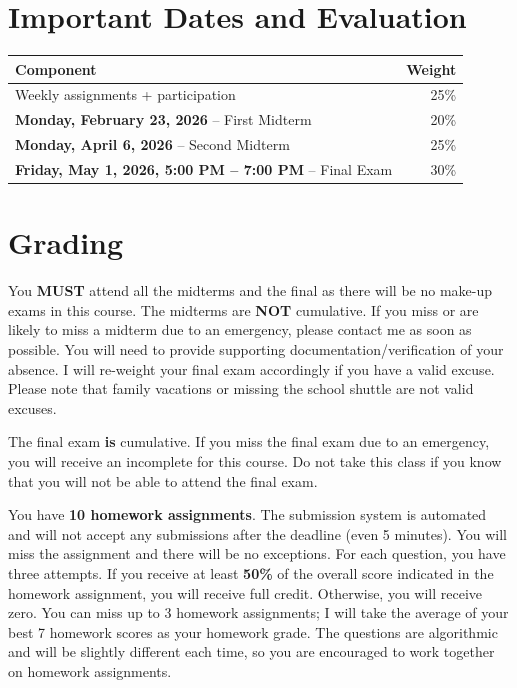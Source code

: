 \documentclass[11pt,letterpaper]{article}
\begin{document}
\section*{Important Dates and Evaluation}

\begin{tabularx}{\textwidth}{@{}Xr@{}}
\toprule
\textbf{Component} & \textbf{Weight} \\
\midrule
Weekly assignments + participation & 25\% \\
\textbf{Monday, February 23, 2026} – First Midterm & 20\% \\
\textbf{Monday, April 6, 2026} – Second Midterm & 25\% \\
\textbf{Friday, May 1, 2026, 5:00 PM – 7:00 PM} – Final Exam & 30\% \\
\bottomrule
\end{tabularx}

\section*{Grading}

You \textbf{MUST} attend all the midterms and the final as there will be no make-up exams in this course. The midterms are \textbf{NOT} cumulative. If you miss or are likely to miss a midterm due to an emergency, please contact me as soon as possible. You will need to provide supporting documentation/verification of your absence. I will re-weight your final exam accordingly if you have a valid excuse. Please note that family vacations or missing the school shuttle are not valid excuses.

The final exam \textbf{is} cumulative. If you miss the final exam due to an emergency, you will receive an incomplete for this course. Do not take this class if you know that you will not be able to attend the final exam.

You have \textbf{10 homework assignments}. The submission system is automated and will not accept any submissions after the deadline (even 5 minutes). You will miss the assignment and there will be no exceptions. For each question, you have three attempts. If you receive at least \textbf{50\%} of the overall score indicated in the homework assignment, you will receive full credit. Otherwise, you will receive zero. You can miss up to 3 homework assignments; I will take the average of your best 7 homework scores as your homework grade. The questions are algorithmic and will be slightly different each time, so you are encouraged to work together on homework assignments.
\end{document}
